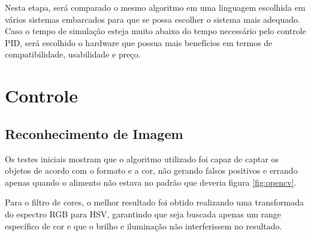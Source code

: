 Nesta etapa, será comparado o mesmo algoritmo em uma linguagem escolhida em vários sistemas embarcados para que se possa escolher o sistema mais adequado. Caso o tempo de simulação esteja muito abaixo do tempo necessário pelo controle PID, será escolhido o hardware que possua mais benefícios em termos de compatibilidade, usabilidade e preço.

\section{Controle}

\subsection{Reconhecimento de Imagem}

Os testes iniciais mostram que o algoritmo utilizado foi capaz de captar os objetos de acordo com o formato e a cor, não gerando falsos positivos e errando apenas quando o alimento não estava no padrão que deveria figura \ref{fig:opencv}.  

Para o filtro de cores, o melhor resultado foi obtido realizando uma transformada do espectro RGB para HSV, garantindo que seja buscada apenas um range específico de cor e que o brilho e iluminação não interferissem no resultado.  

